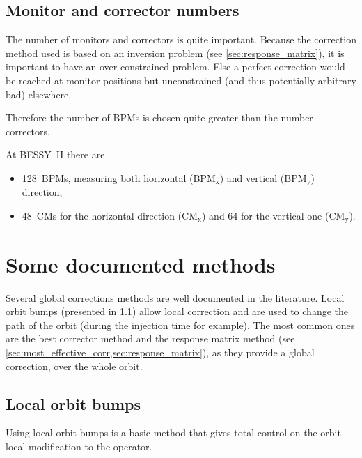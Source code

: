 \subsection{Monitor and corrector numbers}
The number of monitors and correctors is quite important. Because the correction method used is based on an inversion problem (see \cref{sec:response_matrix}), it is important to have an over-constrained problem. Else a perfect correction would be reached at monitor positions but unconstrained (and thus potentially arbitrary bad) elsewhere.

Therefore the number of BPMs is chosen quite greater than the number correctors.

At BESSY~II there are
\begin{itemize}
	\item 128~BPMs, measuring both horizontal ($\text{BPM}_\text{x}$) and vertical ($\text{BPM}_\text{y}$) direction,
	\item 48~CMs for the horizontal direction ($\text{CM}_\text{x}$) and 64 for the vertical one ($\text{CM}_\text{y}$).
\end{itemize}

\section{Some documented methods}
Several global corrections methods are well documented in the literature. Local orbit bumps (presented in \cref{sec:orbit_bump}) allow local correction and are used to change the path of the orbit (during the injection time for example). The most common ones are the best corrector method and the response matrix method (see \cref{sec:most_effective_corr,sec:response_matrix}), as they provide a global correction, over the whole orbit.

\subsection{Local orbit bumps}
\label{sec:orbit_bump}
Using local orbit bumps is a basic method that gives total control on the orbit local modification to the operator.

